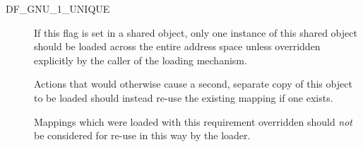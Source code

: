 \begin{description}
 \item[DF_GNU_1_UNIQUE]
      If this flag is set in a shared object, only one instance of this
      shared object should be loaded across the entire address space
      unless overridden explicitly by the caller of the loading mechanism.

      Actions that would otherwise cause a second, separate copy of this
      object to be loaded should instead re-use the existing mapping if
      one exists.

      Mappings which were loaded with this requirement overridden
      should \textit{not} be considered for re-use in this way by
      the loader.
\end{description}

